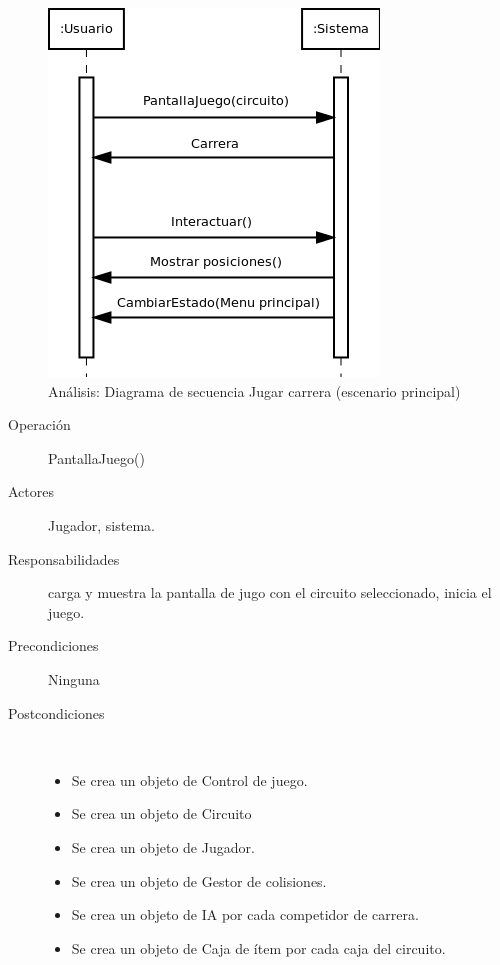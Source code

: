 \begin{figure}[H] 
  \label{secuencia_jugar}
  \begin{center}
    \includegraphics[scale=0.6]{imagenes/analisis/secuencia_jugar.png}
  \end{center}
  \caption{Análisis: Diagrama de secuencia Jugar carrera (escenario principal)}
\end{figure}

\begin{description} 
    \item [Operación] PantallaJuego()
    \item [Actores] Jugador, sistema.
    \item [Responsabilidades] carga y muestra la pantalla de jugo con el circuito seleccionado, inicia el juego.
    \item [Precondiciones] Ninguna
    \item [Postcondiciones] $\quad$
        \begin{itemize}
            \item Se crea un objeto de Control de juego.
            \item Se crea un objeto de Circuito
            \item Se crea un objeto de Jugador.
            \item Se crea un objeto de Gestor de colisiones.
            \item Se crea un objeto de IA por cada competidor de carrera.
            \item Se crea un objeto de Caja de ítem por cada caja del circuito.
        \end{itemize}
\end{description}

